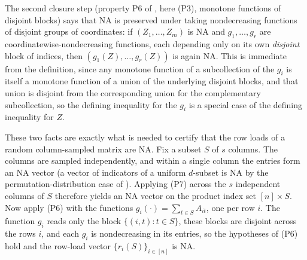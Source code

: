 The second closure step (property P6 of \cite{JoagDevProschan1983}, here (P3), monotone functions of disjoint blocks) says
that NA is preserved under taking nondecreasing functions of disjoint groups of coordinates: if $(Z_1,\dots,Z_m)$ is NA and
$g_1,\dots,g_r$ are coordinatewise-nondecreasing functions, each depending only on its own \emph{disjoint} block of indices,
then $(g_1(Z),\dots,g_r(Z))$ is again NA. This is immediate from the definition, since any monotone function of a
subcollection of the $g_i$ is itself a monotone function of a union of the underlying disjoint blocks, and that union is
disjoint from the corresponding union for the complementary subcollection, so the defining inequality for the $g_i$ is a
special case of the defining inequality for $Z$.

These two facts are exactly what is needed to certify that the row loads of a random column-sampled matrix are NA. Fix a
subset $S$ of $s$ columns. The columns are sampled independently, and within a single column the entries form an NA vector
(a vector of indicators of a uniform $d$-subset is NA by the permutation-distribution case of \cite{JoagDevProschan1983}).
Applying (P7) across the $s$ independent columns of $S$ therefore yields an NA vector on the product index set
$[n]\times S$. Now apply (P6) with the functions $g_i(\cdot)=\sum_{t\in S}A_{it}$, one per row $i$. The function $g_i$ reads
only the block $\{(i,t):t\in S\}$, these blocks are disjoint across the rows $i$, and each $g_i$ is nondecreasing in its
entries, so the hypotheses of (P6) hold and the row-load vector $\{r_i(S)\}_{i\in[n]}$ is NA.

